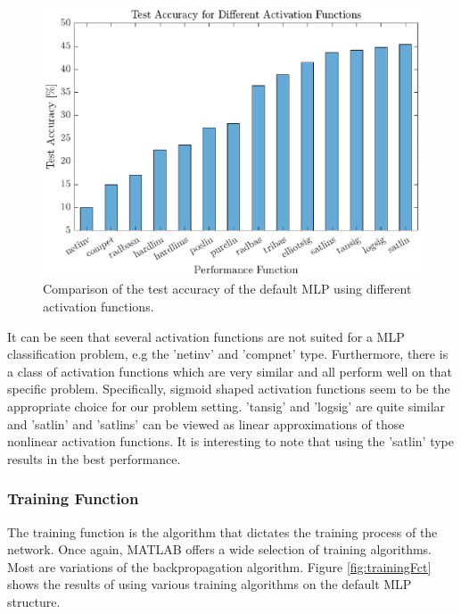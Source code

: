  \begin{figure}[h!]
 	\centering
 	\includegraphics{images/activationFct}
 	\caption{Comparison of the test accuracy of the default MLP using different activation functions.}
 	\label{fig:activationFct}
 \end{figure}
 
 It can be seen that several activation functions are not suited for a MLP classification problem, e.g the 'netinv' and 'compnet' type. Furthermore, there is a class of activation functions which are very similar and all perform well on that specific problem. Specifically, sigmoid shaped activation functions seem to be the appropriate choice for our problem setting. 'tansig' and 'logsig' are quite similar and 'satlin' and 'satlins' can be viewed as linear approximations of those nonlinear activation functions. It is interesting to note that using the 'satlin' type results in the best performance.

\subsubsection{Training Function}

 The training function is the algorithm that dictates the training process of the network. Once again, MATLAB offers a wide selection of training algorithms. Most are variations of the backpropagation algorithm. Figure \ref{fig:trainingFct} shows the results of using various training algorithms on the default MLP structure.
 
